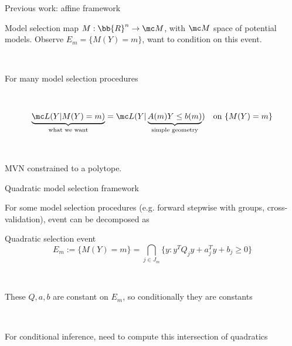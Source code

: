 
  






\begin{frame}{Previous work: affine framework}

  Model selection map $M : \bb{R}^n \to \mc M$, with $\mc M$ space of potential models. Observe $E_m = \{ M(Y) = m \}$, want to condition on this event. 

\ 

For many model selection procedures

  \ 

  \[
    \underbrace{\mc L( Y | M(Y) = m)}_{\text{what we want}} =
    \mc L( Y | \underbrace{{A}(m) Y \leq  b(m) }_{\text{simple geometry}})
    \quad \text{on } \{ M(Y) = m \}
  \]

  \ 

  MVN constrained to a polytope.


\end{frame}


\begin{frame}{Quadratic model selection framework}

  For some model selection procedures (e.g. forward stepwise with groups,
  cross-validation), event can be decomposed as

  \begin{block}{Quadratic selection event}
    \[
    E_m := \{ M(Y) = m \} = \bigcap_{j \in J_m} \{ y : y^TQ_jy + a^T_jy + b_j \geq 0 \}
    \]
  \end{block}
  
  \ 

  These $Q, a, b$ are constant on $E_m$, so conditionally they are constants

  \ 

  For conditional inference, need to compute this intersection of quadratics

\end{frame}

